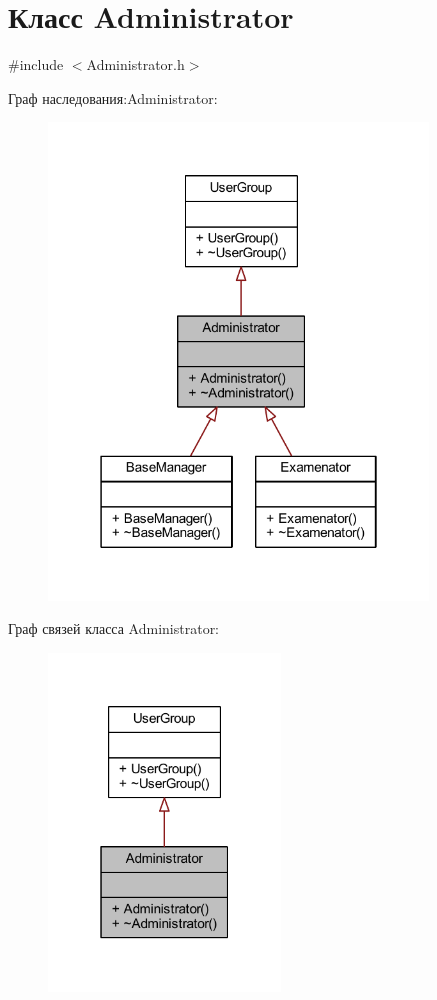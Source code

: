 \hypertarget{class_administrator}{}\section{Класс Administrator}
\label{class_administrator}


{\ttfamily \#include $<$Administrator.\+h$>$}



Граф наследования\+:Administrator\+:\nopagebreak
\begin{figure}[H]
\begin{center}
\leavevmode
\includegraphics[width=286pt]{df/dc2/class_administrator__inherit__graph}
\end{center}
\end{figure}


Граф связей класса Administrator\+:\nopagebreak
\begin{figure}[H]
\begin{center}
\leavevmode
\includegraphics[width=175pt]{de/db4/class_administrator__coll__graph}
\end{center}
\end{figure}
